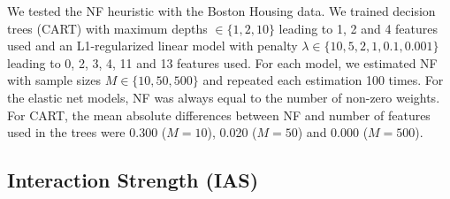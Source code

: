 \documentclass[runningheads]{llncs}\usepackage[]{graphicx}\usepackage[]{color}
\begin{document}



We tested the NF heuristic with the Boston Housing data.
We trained decision trees (CART) with maximum depths $\in\{1,2,10\}$ leading to 1, 2 and  4 features used and an L1-regularized linear model with penalty $\lambda\in\{10, 5, 2, 1, 0.1, 0.001\}$ leading to 0, 2, 3, 4, 11 and 13 features used.
For each model, we estimated NF with sample sizes $M\in\{10, 50, 500\}$ and repeated each estimation 100 times.
For the elastic net models, NF was always equal to the number of non-zero weights. 
For CART, the mean absolute differences between NF and number of features used in the trees were 0.300 ($M=10$), 0.020 ($M=50$) and 0.000 ($M=500$).




\subsection{Interaction Strength (IAS)}
\label{sec:interaction}
\end{document}
